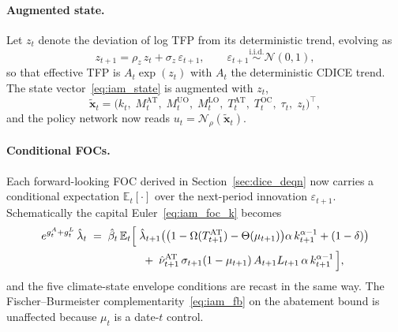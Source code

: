 \documentclass[11pt,a4paper]{report}
\begin{document}
\paragraph{Augmented state.}
Let $z_t$ denote the deviation of log TFP from its deterministic trend, evolving as
\begin{equation}
z_{t+1} = \rho_z\, z_t + \sigma_z\, \varepsilon_{t+1}, \qquad \varepsilon_{t+1} \overset{\mathrm{i.i.d.}}{\sim} \mathcal{N}(0,1),
\label{eq:tfp_ar1}
\end{equation}
so that effective TFP is $A_t \exp(z_t)$ with $A_t$ the deterministic CDICE trend.  The state vector~\eqref{eq:iam_state} is augmented with $z_t$,
\begin{equation}
\tilde{\bm{x}}_t = \bigl(k_t,\; M^{\mathrm{AT}}_t,\; M^{\mathrm{UO}}_t,\; M^{\mathrm{LO}}_t,\; T^{\mathrm{AT}}_t,\; T^{\mathrm{OC}}_t,\; \tau_t,\; z_t\bigr)^\top,
\label{eq:iam_state_stoch}
\end{equation}
and the policy network now reads $u_t = \mathcal{N}_\rho(\tilde{\bm{x}}_t)$.

\paragraph{Conditional FOCs.}
Each forward-looking FOC derived in Section~\ref{sec:dice_deqn} now carries a conditional expectation $\mathbb{E}_t[\cdot]$ over the next-period innovation $\varepsilon_{t+1}$.  Schematically the capital Euler~\eqref{eq:iam_foc_k} becomes
\begin{equation}
\begin{aligned}
e^{g^A_t + g^L_t}\,\hat{\lambda}_t \;=\; \hat{\beta}_t\,\mathbb{E}_t\Bigl[\;
&\hat{\lambda}_{t+1}\bigl(\bigl(1-\Omega(T^{\mathrm{AT}}_{t+1}) - \Theta(\mu_{t+1})\bigr)\alpha\,k_{t+1}^{\alpha-1} + (1-\delta)\bigr) \\
&\;+\; \hat{\nu}^{\mathrm{AT}}_{t+1}\,\sigma_{t+1}(1-\mu_{t+1})\,A_{t+1}L_{t+1}\,\alpha\,k_{t+1}^{\alpha-1}\,\Bigr],
\end{aligned}
\label{eq:iam_euler_stoch}
\end{equation}
and the five climate-state envelope conditions are recast in the same way.  The Fischer--Burmeister complementarity~\eqref{eq:iam_fb} on the abatement bound is unaffected because $\mu_t$ is a date-$t$ control.
\end{document}
